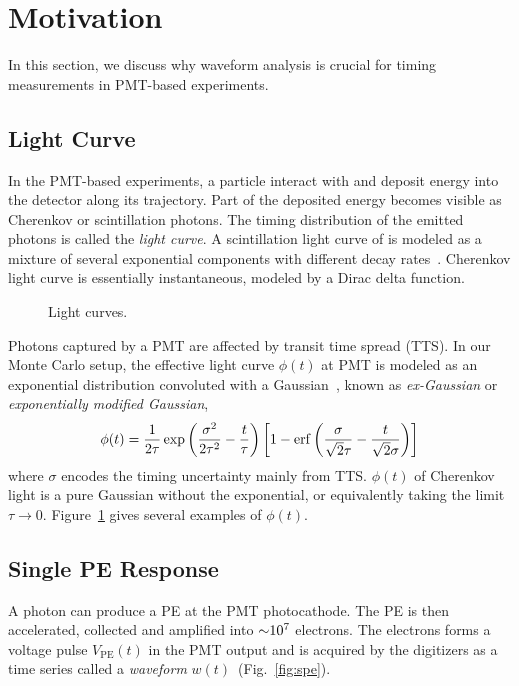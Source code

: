 \section{Motivation} %
\label{sec:toyMC}

In this section, we discuss why waveform analysis is crucial for timing measurements in PMT-based experiments. 

\subsection{Light Curve}
In the PMT-based experiments, a particle interact with and deposit energy into the detector along its trajectory. Part of the deposited energy becomes visible as Cherenkov or scintillation photons.  The timing distribution of the emitted photons is called the \textit{light curve}.  A scintillation light curve of is modeled as a mixture of several exponential components with different decay rates~\cite{ludhova_particle_2020}.  Cherenkov light curve is essentially instantaneous, modeled by a Dirac delta function.

\begin{figure}[!htb]
  \centering
  \resizebox{0.5\textwidth}{!}{}
  \caption{\label{fig:time-pro} Light curves.}
\end{figure}

Photons captured by a PMT are affected by transit time spread (TTS).  In our Monte Carlo setup, the effective light curve $\phi(t)$ at PMT is modeled as an exponential distribution convoluted with a Gaussian~\cite{li_separation_2016}, known as \textit{ex-Gaussian} or \textit{exponentially modified Gaussian},
\begin{align}
    \phi(t) = \frac{1}{2\tau} \exp\left(\frac{\sigma^2}{2\tau^2}-\frac{t}{\tau}\right) \left[1 - \operatorname{erf}\left( \frac{\sigma}{\sqrt{2}\tau} - \frac{t}{\sqrt{2}\sigma} \right)\right]
    \label{eq:time-pro}
\end{align}
where $\sigma$ encodes the timing uncertainty mainly from TTS.  $\phi(t)$ of Cherenkov light is a pure Gaussian without the exponential, or equivalently taking the limit $\tau \rightarrow 0$.  Figure~\ref{fig:time-pro} gives several examples of $\phi(t)$.

\subsection{Single PE Response}
A photon can produce a PE at the PMT photocathode.  The PE is then accelerated, collected and amplified into $\num[retain-unity-mantissa=false]{\sim 1e7}$ electrons.  The electrons forms a voltage pulse $V_\mathrm{PE}(t)$ in the PMT output and is acquired by the digitizers as a time series called a \textit{waveform} $w(t)$~(Fig.~\ref{fig:spe}).

